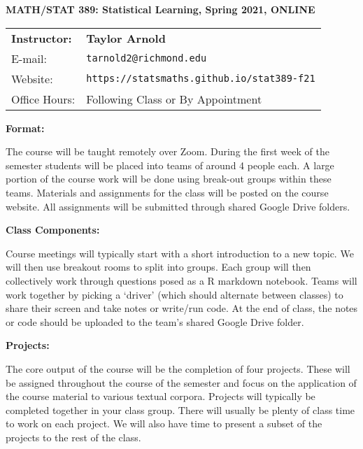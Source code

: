 \documentclass[12pt, a4paper]{article}
\begin{document}
\begin{center}
\textbf{MATH/STAT 389: Statistical Learning, Spring 2021, ONLINE}
\end{center}

\noindent
\begin{tabular}{ l l }
\textbf{Instructor:} &  \textbf{Taylor Arnold} \\
E-mail: & \texttt{tarnold2@richmond.edu} \\
Website: & \texttt{https://statsmaths.github.io/stat389-f21} \\
Office Hours: & Following Class or By Appointment
\end{tabular}

\vspace{0.5cm}

\textbf{Format:} \vspace{6pt}

The course will be taught remotely over Zoom. During the first week of the
semester students will be placed into teams of around 4 people each. A large
portion of the course work will be done using break-out groups within these
teams. Materials and assignments for the class will be posted on the course
website. All assignments will be submitted through shared Google Drive folders.

\vspace{12pt}

\textbf{Class Components:} \vspace{6pt}

Course meetings will typically start with a short introduction to a new topic.
We will then use breakout rooms to split into groups. Each group will then
collectively work through questions posed as a R markdown notebook.
Teams will work together by picking a `driver' (which should alternate between
classes) to share their screen and take notes or write/run code. At the end of
class, the notes or code should be uploaded to the team's shared Google Drive
folder.

\vspace{12pt}

\textbf{Projects:} \vspace{6pt}

The core output of the course will be the completion of four projects. These
will be assigned throughout the course of the semester and focus on the
application of the course material to various textual corpora. Projects will
typically be completed together in your class group. There will
usually be plenty of class time to work on each project. We will also have
time to present a subset of the projects to the rest of the class.
\end{document}

